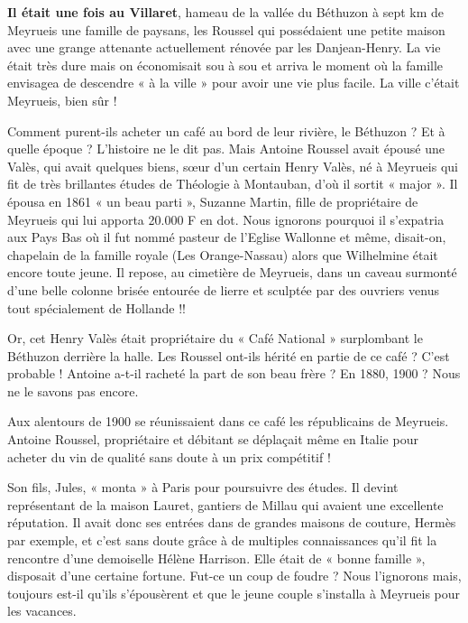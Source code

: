 
\textbf{Il était une fois au Villaret}, hameau de la vallée du Béthuzon à sept km de Meyrueis une
famille de paysans, les Roussel qui possédaient une petite maison avec une grange attenante
actuellement rénovée par les Danjean-Henry. La vie était très dure mais on économisait sou
à sou et arriva le moment où la famille envisagea de descendre « à la ville » pour avoir une
vie plus facile. La ville c’était Meyrueis, bien sûr !

\medskip

Comment purent-ils acheter un café au bord de leur rivière, le Béthuzon ? Et à quelle époque ?
L’histoire ne le dit pas. Mais Antoine Roussel avait épousé une Valès, qui avait quelques
biens, sœur d’un certain Henry Valès, né à Meyrueis qui fit de très brillantes études de
Théologie à Montauban, d’où il sortit « major ». Il épousa en 1861 « un beau parti », Suzanne
Martin, fille de propriétaire de Meyrueis qui lui apporta 20.000 F en dot. Nous ignorons
pourquoi il s’expatria aux Pays Bas où il fut nommé pasteur de l’Eglise Wallonne et même,
disait-on, chapelain de la famille royale (Les Orange-Nassau) alors que Wilhelmine était
encore toute jeune. Il repose, au cimetière de Meyrueis, dans un caveau surmonté d’une belle
colonne brisée entourée de lierre et sculptée par des ouvriers venus tout spécialement de
Hollande !!

\medskip

Or, cet Henry Valès était propriétaire du « Café National » surplombant le Béthuzon derrière la
halle. Les Roussel ont-ils hérité en partie de ce café ? C’est probable ! Antoine a-t-il racheté la
part de son beau frère ? En 1880, 1900 ? Nous ne le savons pas encore.

\medskip

Aux alentours de 1900 se réunissaient dans ce café les républicains de Meyrueis. Antoine
Roussel, propriétaire et débitant se déplaçait même en Italie pour acheter du vin de qualité
sans doute à un prix compétitif !

\medskip

Son fils, Jules, « monta » à Paris pour poursuivre des études. Il devint représentant de la
maison Lauret, gantiers de Millau qui avaient une excellente réputation. Il avait donc ses
entrées dans de grandes maisons de couture, Hermès par exemple, et c’est sans doute grâce à
de multiples connaissances qu’il fit la rencontre d’une demoiselle Hélène Harrison. Elle était
de « bonne famille », disposait d’une certaine fortune. Fut-ce un coup de foudre ? Nous
l’ignorons mais, toujours est-il qu’ils s’épousèrent et que le jeune couple s’installa à Meyrueis
pour les vacances.

